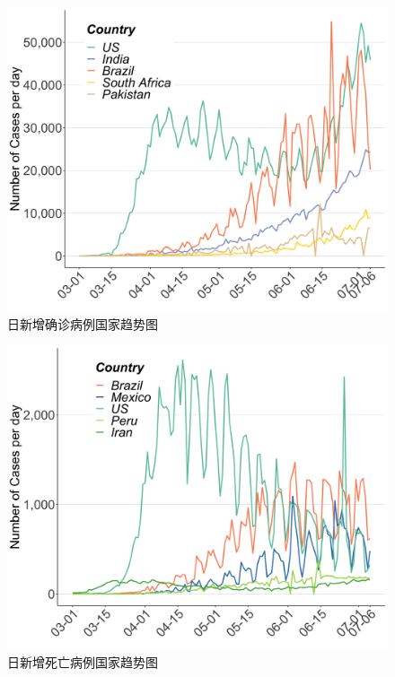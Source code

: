 \documentclass[]{article}
\begin{document}
\vspace{-7mm}

\begin{figure}[H]
\centering

\vspace{2mm}
\caption{日新增确诊病例国家趋势图}
\includegraphics[]{./input/covid2.png}
\end{figure}

\begin{figure}[H]
\centering

\caption{日新增死亡病例国家趋势图}
\includegraphics[]{./input/covid3.png}
\end{figure}
\end{document}
